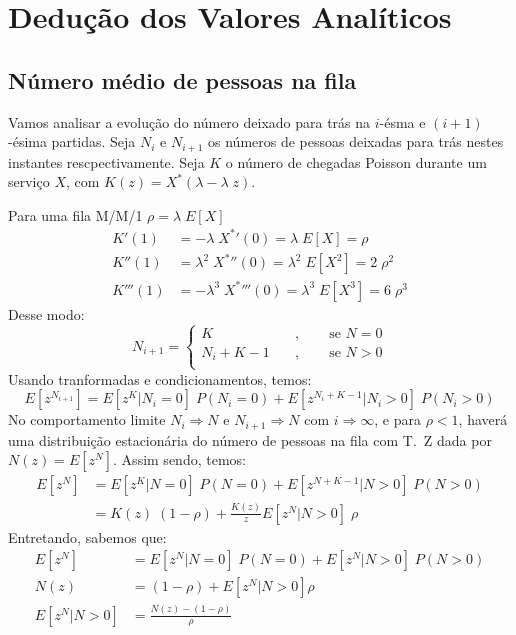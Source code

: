 \documentclass[a4paper]{article}
\newcommand{\E}[1]{E\!\left[#1\right]}
\begin{document}
\newpage
\section{Dedução dos Valores Analíticos}
\subsection{Número médio de pessoas na fila}
Vamos analisar a evolução do número
deixado para trás na \(i\)-ésma e \((i+1)\)-ésima partidas.
Seja \(N_i\) e  \(N_{i+1}\) os números de pessoas
deixadas para trás nestes instantes rescpectivamente.
Seja \(K\) o número de chegadas Poisson
durante um serviço \(X\),
com \(K(z) = X^*(\lambda - \lambda \; z)\).

Para uma fila M/M/1 \(\rho = \lambda \; \E{X}\)
\begin{align*}
    K'(1) &= -\lambda \; {X^*}'(0) = \lambda \; \E{X}
        = \rho \\
    K''(1) &= \lambda^2 \; {X^*}''(0)
        = \lambda^2 \; \E{X^2} = 2 \; \rho^2 \\
    K'''(1) &= - \lambda^3 \; {X^*}'''(0)
        = \lambda^3 \; \E{X^3} = 6 \; \rho^3
\end{align*}
Desse modo:
\[
    N_{i+1} = \begin{cases}
                K \quad&, \qquad\text{se } N = 0 \\
                N_i + K - 1 \quad&, \qquad\text{se } N > 0 \\    
        \end{cases}
\]
Usando tranformadas e condicionamentos, temos:
\[
    \E{z^{N_{i+1}}}
        = \E{z^{K} | N_i = 0} \; P(N_i = 0)
        + \E{z^{N_{i}+K-1} | N_i > 0} \; P(N_i > 0)
\]
No comportamento limite
\(N_i \Rightarrow N\) e \(N_{i+1} \Rightarrow N\)
com \(i \Rightarrow \infty\),
e para \(\rho < 1 \),
haverá uma distribuição estacionária
do número de pessoas na fila com T.~Z dada por
\(N(z) = \E{z^N}\).
Assim sendo, temos:
\begin{align*}
    \E{z^N} &= \E{z^K | N = 0} \; P(N = 0)
        + \E{z^{N+K-1} | N>0} \; P(N > 0) \\
    &= K(z) \; (1 - \rho)
        + \frac{K(z)}{z} \E{z^N | N > 0} \; \rho
\end{align*}
Entretando, sabemos que:
\begin{align*}
    \E{z^N} &= \E{z^N| N = 0} \; P(N = 0)
        + \E{z^N  | N > 0} \; P(N > 0) \\
    N(z) &= (1 - \rho) + \E{z^N | N > 0} \rho \\
    \E{z^N | N > 0} &= \frac{N(z) - (1 - \rho)}{\rho}
\end{align*}
\end{document}
